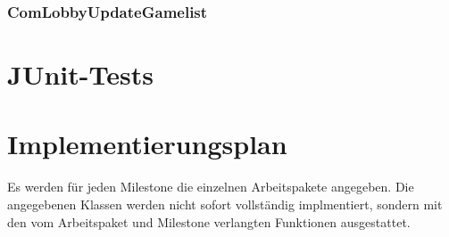 \documentclass{article}
\begin{document}
\subsubsection{ComLobbyUpdateGamelist}
\newpage

\section{JUnit-Tests}
\newpage

\section{Implementierungsplan}
Es werden für jeden Milestone die einzelnen Arbeitspakete angegeben. Die angegebenen Klassen werden nicht sofort vollständig implmentiert, sondern mit den vom Arbeitspaket und Milestone verlangten Funktionen ausgestattet.\\
\end{document}
